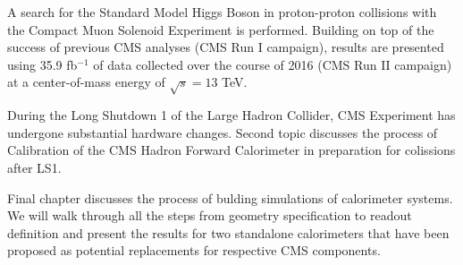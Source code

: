 A search for the Standard Model Higgs Boson in proton-proton collisions with the Compact Muon Solenoid Experiment is performed. Building on top of the success of previous CMS analyses (CMS Run I campaign), results are presented using 35.9 fb$^{-1}$ of data collected over the course of 2016 (CMS Run II campaign) at a center-of-mass energy of $\sqrt{s} = 13$ TeV.

During the Long Shutdown 1 of the Large Hadron Collider, CMS Experiment has undergone substantial hardware changes. Second topic discusses the process of Calibration of the CMS Hadron Forward Calorimeter in preparation for colissions after LS1.

Final chapter discusses the process of bulding simulations of calorimeter systems. We will walk through all the steps from geometry specification to readout definition and present the results for two standalone calorimeters that have been proposed as potential replacements for respective CMS components.